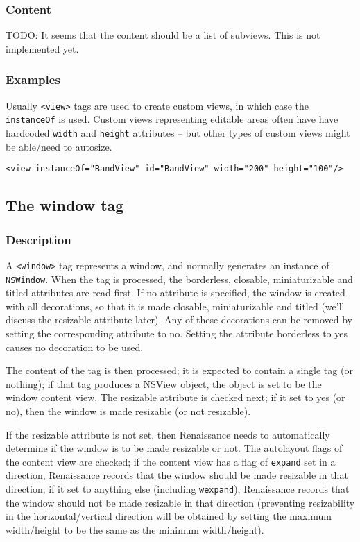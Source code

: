 \subsubsection{Content}
TODO: It seems that the content should be a list of subviews.  This is
not implemented yet.

\subsubsection{Examples}
Usually \texttt{<view>} tags are used to create custom views, in which
case the \texttt{instanceOf} is used.  Custom views representing
editable areas often have have hardcoded \texttt{width} and
\texttt{height} attributes -- but other types of custom views might
be able/need to autosize.
\begin{verbatim}
<view instanceOf="BandView" id="BandView" width="200" height="100"/>
\end{verbatim}

\subsection{The window tag}
\subsubsection{Description}
A \texttt{<window>} tag represents a window, and normally generates an
instance of \texttt{NSWindow}.  When the tag is processed, the
borderless, closable, miniaturizable and titled attributes are read
first.  If no attribute is specified, the window is created with all
decorations, so that it is made closable, miniaturizable and titled
(we'll discuss the resizable attribute later).  Any of these
decorations can be removed by setting the corresponding attribute to
no.  Setting the attribute borderless to yes causes no decoration to
be used.

The content of the tag is then processed; it is expected to contain a
single tag (or nothing); if that tag produces a NSView object, the
object is set to be the window content view.  The resizable attribute
is checked next; if it set to yes (or no), then the window is made
resizable (or not resizable).

If the resizable attribute is not set, then Renaissance needs to
automatically determine if the window is to be made resizable or not.
The autolayout flags of the content view are checked; if the content
view has a flag of \texttt{expand} set in a direction, Renaissance
records that the window should be made resizable in that direction; if
it set to anything else (including \texttt{wexpand}), Renaissance
records that the window should not be made resizable in that direction
(preventing resizability in the horizontal/vertical direction will be
obtained by setting the maximum width/height to be the same as the
minimum width/height).

